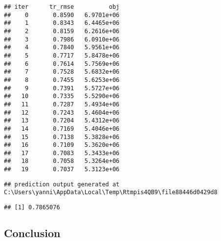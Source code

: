\documentclass[
]{article}
\newenvironment{Shaded}{\begin{snugshade}}{\end{snugshade}}
\newcommand{\KeywordTok}[1]{\textcolor[rgb]{0.13,0.29,0.53}{\textbf{#1}}}
\newcommand{\NormalTok}[1]{#1}
\newcommand{\OperatorTok}[1]{\textcolor[rgb]{0.81,0.36,0.00}{\textbf{#1}}}
\newcommand{\StringTok}[1]{\textcolor[rgb]{0.31,0.60,0.02}{#1}}
\begin{document}
\begin{verbatim}
## iter      tr_rmse          obj
##    0       0.8590   6.9701e+06
##    1       0.8343   6.4465e+06
##    2       0.8159   6.2616e+06
##    3       0.7986   6.0910e+06
##    4       0.7840   5.9561e+06
##    5       0.7717   5.8478e+06
##    6       0.7614   5.7569e+06
##    7       0.7528   5.6832e+06
##    8       0.7455   5.6253e+06
##    9       0.7391   5.5727e+06
##   10       0.7335   5.5290e+06
##   11       0.7287   5.4934e+06
##   12       0.7243   5.4604e+06
##   13       0.7204   5.4312e+06
##   14       0.7169   5.4046e+06
##   15       0.7138   5.3828e+06
##   16       0.7109   5.3620e+06
##   17       0.7083   5.3433e+06
##   18       0.7058   5.3264e+06
##   19       0.7037   5.3123e+06
\end{verbatim}

\begin{Shaded}
\end{Shaded}

\begin{verbatim}
## prediction output generated at C:\Users\yanni\AppData\Local\Temp\Rtmpis4QB9\file88446d0429d8
\end{verbatim}

\begin{Shaded}
\end{Shaded}

\begin{verbatim}
## [1] 0.7865076
\end{verbatim}

\hypertarget{conclusion}{%
\subsection{Conclusion}\label{conclusion}}
\end{document}
